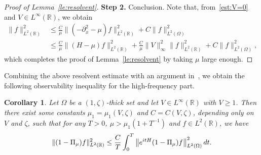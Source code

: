 \documentclass[a4paper,reqno]{amsart}
\newtheorem{corollary}[theorem]{Corollary}
\theoremstyle{definition}
\numberwithin{equation}{section}
\newcommand{\R}{\mathbb{R}}
\def \R {{\mathbb{R} }}
\def \d {{\rm{d}}}
\begin{document}
\begin{proof}[Proof of Lemma~\ref{le:resolvent}]
\smallskip
    \textbf{Step 2.} Conclusion. Note that, from~\eqref{est:V=0} and $V\in L^{\infty}(\R)$, we obtain
    \begin{equation*}
    \begin{aligned}
        \|f\|_{L^{2}(\R)}^{2}
        &\le  \frac{C}{\mu}\|(-\partial_{x}^{2}-\mu)f\|_{L^{2}(\R)}^{2}+C\|f\|_{L^{2}(\Omega)}^{2}\\
        &\le \frac{C}{\mu}\|(H-\mu)f\|_{L^{2}(\R)}^{2}
        +\frac{C}{\mu}\|V\|_{\infty}^{2}\|f\|^{2}_{L^{2}(\R)}
        +C\|f\|_{L^{2}(\Omega)}^{2},        
        \end{aligned}
        \end{equation*}
        which completes the proof of Lemma~\ref{le:resolvent} by taking $\mu$ large enough.
\end{proof}


Combining the above resolvent estimate with an argument in~\cite[Section 3]{BZ1}, we obtain the following observability inequality for the high-frequency part.

\begin{corollary}\label{coro:High}
Let $\Omega$ be a $(1,\zeta)$-thick set and let $V\in L^{\infty}(\R)$ with $V\ge 1$. 
Then there exist some constants $\mu_{1}=\mu_{1}(V,\zeta)$ and  $C=C(V,\zeta)$, depending only on $V$ and $\zeta$, such that for any $T>0$, $\mu>\mu_{1}\left(1+T^{-1}\right)$ and $f\in L^{2}(\R)$, we have 
\begin{equation*}
\|(1-\Pi_{\mu})f\|_{L^{2}(\R)}^{2}\le \frac{C}{T}\int_{0}^{T}\left\|e^{it{H}}(1-\Pi_{\mu})f\right\|_{L^{2}(\Omega)}^{2}\d t.
\end{equation*}

\end{corollary}
\end{document}
